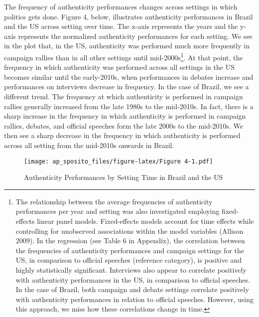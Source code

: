 \documentclass[
  12pt,
]{article}
\begin{document}
The frequency of authenticity performances changes across settings in
which politics gets done. Figure 4, below, illustrates authenticity
performances in Brazil and the US across setting over time. The x-axis
represents the years and the y-axis represents the normalized
authenticity performances for each setting. We see in the plot that, in
the US, authenticity was performed much more frequently in campaign
rallies than in all other settings until mid-2000s\footnote{ The
  relationship between the average frequencies of authenticity
  performances per year and setting was also investigated employing
  fixed-effects linear panel models. Fixed-effects models account for
  time effects while controlling for unobserved associations within the
  model variables (Allison 2009). In the regression (see Table 6 in
  Appendix), the correlation between the frequencies of authenticity
  performances and campaign settings for the US, in comparison to
  official speeches (reference category), is positive and highly
  statistically significant. Interviews also appear to correlate
  positively with authenticity performances in the US, in comparison to
  official speeches. In the case of Brazil, both campaign and debate
  settings correlate positively with authenticity performances in
  relation to official speeches. However, using this approach, we miss
  how these correlations change in time.}. At that point, the frequency
in which authenticity was performed across all settings in the US
becomes similar until the early-2010s, when performances in debates
increase and performances on interviews decrease in frequency. In the
case of Brazil, we see a different trend. The frequency at which
authenticity is performed in campaign rallies generally increased from
the late 1980s to the mid-2010s. In fact, there is a sharp increase in
the frequency in which authenticity is performed in campaign rallies,
debates, and official speeches form the late 2000s to the mid-2010s. We
then see a sharp decrease in the frequency in which authenticity is
performed across all setting from the mid-2010s onwards in Brazil.

\begin{figure}
\centering
\texttt{[image: ap\_sposito\_files/figure-latex/Figure 4-1.pdf]}
\caption{Authenticity Performances by Setting Time in Brazil and the US}
\end{figure}
\end{document}
